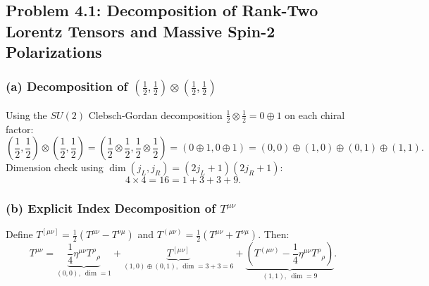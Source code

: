 \documentclass[11pt,a4paper]{article}
\begin{document}
\subsection{Problem 4.1: Decomposition of Rank-Two Lorentz Tensors and Massive Spin-2 Polarizations}

\subsubsection*{(a) Decomposition of $(\frac{1}{2}, \frac{1}{2}) \otimes (\frac{1}{2}, \frac{1}{2})$}
Using the $SU(2)$ Clebsch-Gordan decomposition $\frac{1}{2} \otimes \frac{1}{2} = 0 \oplus 1$ on each chiral factor:
\begin{equation}
    \left(\frac{1}{2}, \frac{1}{2}\right) \otimes \left(\frac{1}{2}, \frac{1}{2}\right) = \left(\frac{1}{2} \otimes \frac{1}{2}, \frac{1}{2} \otimes \frac{1}{2}\right) = (0 \oplus 1, 0 \oplus 1) = (0,0) \oplus (1,0) \oplus (0,1) \oplus (1,1).
\end{equation}
Dimension check using $\dim(j_L, j_R) = (2j_L+1)(2j_R+1)$:
\begin{equation}
    4 \times 4 = 16 = 1 + 3 + 3 + 9.
\end{equation}

\subsubsection*{(b) Explicit Index Decomposition of $T^{\mu\nu}$}
Define $T^{[\mu\nu]} = \frac{1}{2}(T^{\mu\nu} - T^{\nu\mu})$ and $T^{(\mu\nu)} = \frac{1}{2}(T^{\mu\nu} + T^{\nu\mu})$. Then:
\begin{equation}
    T^{\mu\nu} = \underbrace{\frac{1}{4}\eta^{\mu\nu}T^\rho{}_\rho}_{(0,0),\ \dim=1} + \underbrace{T^{[\mu\nu]}}_{(1,0)\oplus(0,1),\ \dim=3+3=6} + \underbrace{\left(T^{(\mu\nu)} - \frac{1}{4}\eta^{\mu\nu}T^\rho{}_\rho\right)}_{(1,1),\ \dim=9}.
\end{equation}
\end{document}
